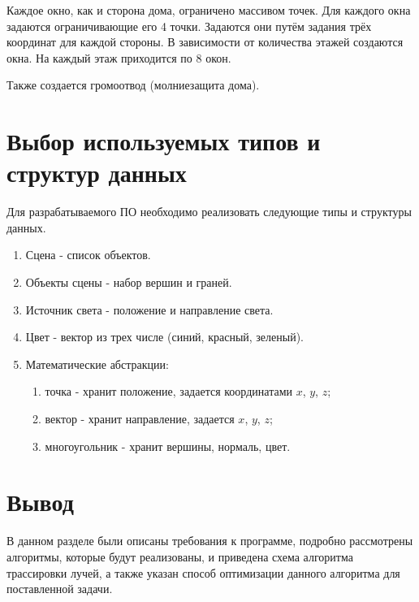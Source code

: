 Каждое окно, как и сторона дома, ограничено массивом точек. Для каждого окна задаются ограничивающие его 4 точки. Задаются они путём задания трёх координат для каждой стороны. В зависимости от количества этажей создаются окна. На каждый этаж приходится по 8 окон. 

Также создается громоотвод (молниезащита дома). 

\section{Выбор используемых типов и структур данных}

Для разрабатываемого ПО необходимо реализовать следующие типы и структуры данных.
\begin{enumerate}
	\item Сцена - список объектов.
	\item Объекты сцены - набор вершин и граней.
	\item Источник света - положение и направление света.
	\item Цвет - вектор из трех числе (синий, красный, зеленый).
	\item Математические абстракции:
	\begin{enumerate}
		\item точка - хранит положение, задается координатами $x$, $y$, $z$;
		\item вектор - хранит направление, задается  $x$, $y$, $z$;
		\item многоугольник - хранит вершины, нормаль, цвет.
	\end{enumerate}
\end{enumerate}


\section{Вывод}
В данном разделе были описаны требования к программе, подробно рассмотрены алгоритмы, которые будут реализованы, и приведена схема алгоритма трассировки лучей, а также указан способ оптимизации данного алгоритма для поставленной задачи.

